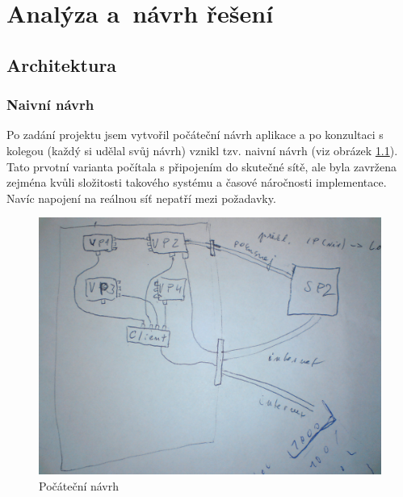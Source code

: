 \chapter{Analýza a~návrh řešení}\label{kap:analyza}






\section{Architektura}

\subsection{Naivní návrh}
Po zadání projektu jsem vytvořil počáteční návrh aplikace a po konzultaci s kolegou (každý si udělal svůj návrh) vznikl tzv. naivní návrh (viz obrázek \ref{fig:navrh}). Tato prvotní varianta počítala s připojením do skutečné sítě, ale byla zavržena zejména kvůli složitosti takového systému a časové náročnosti implementace. Navíc napojení na reálnou síť nepatří mezi požadavky.

\begin{figure}[h]
\begin{center}
\includegraphics[width=12cm]{figures/navrh}
\caption{Počáteční návrh}
\label{fig:navrh}
\end{center}
\end{figure}

